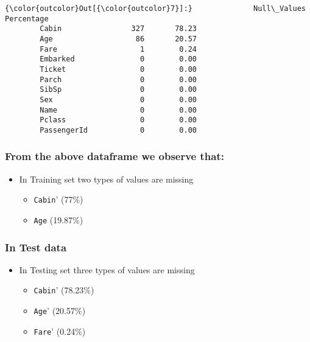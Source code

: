 \documentclass[11pt]{article}
\providecommand{\tightlist}{%
      \setlength{\itemsep}{0pt}\setlength{\parskip}{0pt}}
\begin{document}
\begin{Verbatim}[commandchars=\\\{\}]
{\color{outcolor}Out[{\color{outcolor}7}]:}              Null\_Values  Percentage
        Cabin                327       78.23
        Age                   86       20.57
        Fare                   1        0.24
        Embarked               0        0.00
        Ticket                 0        0.00
        Parch                  0        0.00
        SibSp                  0        0.00
        Sex                    0        0.00
        Name                   0        0.00
        Pclass                 0        0.00
        PassengerId            0        0.00
\end{Verbatim}
            
    \hypertarget{from-the-above-dataframe-we-observe-that}{%
\subsubsection{From the above dataframe we observe
that:}\label{from-the-above-dataframe-we-observe-that}}

\begin{itemize}
\tightlist
\item
  In Training set two types of values are missing

  \begin{itemize}
  \tightlist
  \item
    \texttt{\textquotesingle{}Cabin}' (77\%)
  \item
    \texttt{\textquotesingle{}Age\textquotesingle{}} (19.87\%)
  \end{itemize}
\end{itemize}

\hypertarget{in-test-data}{%
\subsubsection{In Test data}\label{in-test-data}}

\begin{itemize}
\tightlist
\item
  In Testing set three types of values are missing

  \begin{itemize}
  \tightlist
  \item
    \texttt{\textquotesingle{}Cabin}' (78.23\%)
  \item
    \texttt{\textquotesingle{}Age}' (20.57\%)
  \item
    \texttt{\textquotesingle{}Fare}' (0.24\%)
  \end{itemize}
\end{itemize}
\end{document}
